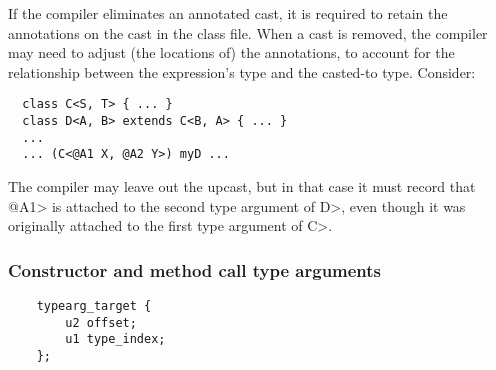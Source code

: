 \documentclass[10pt]{article}
\begin{document}
If the compiler eliminates an annotated cast, it is required to retain the
annotations on the cast in the class file.  When a cast is removed, the
compiler may need to adjust (the locations of) the annotations, to account
for the relationship between the expression's type and the casted-to type.
Consider:

\preverbnegspace
\begin{Verbatim}
  class C<S, T> { ... }
  class D<A, B> extends C<B, A> { ... }
  ...
  ... (C<@A1 X, @A2 Y>) myD ...
\end{Verbatim}

\noindent
The compiler may leave out the upcast, but in that case it must record that
\<@A1> is attached to the second type argument of \<D>, even though it was
originally attached to the first type argument of \<C>.




\subsubsection{Constructor and method call type arguments\label{class-file:ext:ri:con-typearg}}


\preverbnegspace
\begin{Verbatim}
    typearg_target {
        u2 offset;
        u1 type_index;
    };
\end{Verbatim}
\end{document}
